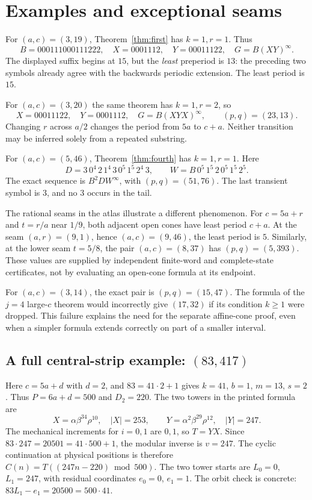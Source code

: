 \documentclass[11pt]{article}
\theoremstyle{remark}\newtheorem{remark}[theorem]{Remark}
\newcommand{\per}{^{\infty}}
\begin{document}
\section{Examples and exceptional seams}
For $(a,c)=(3,19)$, Theorem~\ref{thm:first} has $k=1,r=1$. Thus
\[B=000111000111222,\quad X=0001112,\quad Y=00011122,\quad G=B(XY)\per.\]
The displayed suffix begins at $15$, but the \emph{least} preperiod is $13$: the preceding two symbols already agree with the backwards periodic extension. The least period is $15$.

For $(a,c)=(3,20)$ the same theorem has $k=1,r=2$, so
\[X=00011122,\quad Y=0001112,\quad G=B(XYX)\per,\qquad(p,q)=(23,13).\]
Changing $r$ across $a/2$ changes the period from $5a$ to $c+a$. Neither transition may be inferred solely from a repeated substring.

For $(a,c)=(5,46)$, Theorem~\ref{thm:fourth} has $k=1,r=1$. Here
\[D=3\,0^4\,2\,1^4\,3\,0^5\,1^5\,2^4\,3,\qquad
W=B\,0^5\,1^5\,2\,0^5\,1^5\,2^5.\]
The exact sequence is $B^2DW\per$, with $(p,q)=(51,76)$. The last transient symbol is $3$, and no $3$ occurs in the tail.


The rational seams in the atlas illustrate a different phenomenon. For $c=5a+r$ and $t=r/a$ near $1/9$, both adjacent open cones have least period $c+a$. At the seam $(a,r)=(9,1)$, hence $(a,c)=(9,46)$, the least period is $5$. Similarly, at the lower seam $t=5/8$, the pair $(a,c)=(8,37)$ has $(p,q)=(5,393)$. These values are supplied by independent finite-word and complete-state certificates, not by evaluating an open-cone formula at its endpoint.

For $(a,c)=(3,14)$, the exact pair is $(p,q)=(15,47)$. The formula of the $j=4$ large-$c$ theorem would incorrectly give $(17,32)$ if its condition $k\ge1$ were dropped. This failure explains the need for the separate affine-cone proof, even when a simpler formula extends correctly on part of a smaller interval.



\subsection{A full central-strip example: \texorpdfstring{$(83,417)$}{(83,417)}}\label{sec:central-example}
Here $c=5a+d$ with $d=2$, and $83=41\cdot2+1$ gives
$k=41$, $b=1$, $m=13$, $s=2$. Thus $P=6a+d=500$ and $D_2=220$.
The two towers in the printed formula are
\[
X=\alpha\beta^{34}\rho^{10},\quad |X|=253,\qquad
Y=\alpha^2\beta^{29}\rho^{12},\quad |Y|=247.
\]
The mechanical increments for $i=0,1$ are $0,1$, so $T=YX$.
Since $83\cdot247=20501=41\cdot500+1$, the modular inverse is $v=247$.
The cyclic continuation at physical positions is therefore
$C(n)=T((247n-220)\bmod500)$.
The two tower starts are $L_0=0$, $L_1=247$, with residual coordinates
$e_0=0$, $e_1=1$. The orbit check is concrete:
$83L_1-e_1=20500=500\cdot41$.
\end{document}
